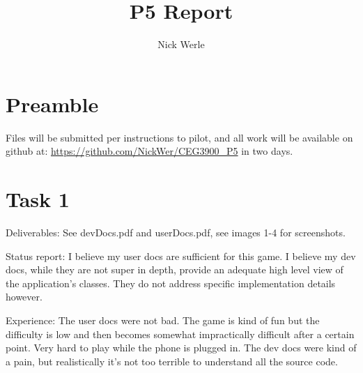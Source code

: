 \documentclass{article}
\title{P5 Report}
\author{Nick Werle}
\begin{document}
\maketitle
\section{Preamble}
Files will be submitted per instructions to pilot, and all work will be available on github at: \url{https://github.com/NickWer/CEG3900_P5} in two days.

\section{Task 1}
Deliverables: See devDocs.pdf and userDocs.pdf, see images 1-4 for screenshots.

Status report: I believe my user docs are sufficient for this game. I believe my dev docs, while they are not super in depth, provide an adequate high level view of the application's classes. They do not address specific implementation details however.

Experience: The user docs were not bad. The game is kind of fun but the difficulty is low and then becomes somewhat impractically difficult after a certain point. Very hard to play while the phone is plugged in. The dev docs were kind of a pain, but realistically it's not too terrible to understand all the source code.
\end{document}
